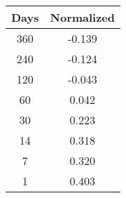 \begin{tabular}{||c c||} 
 \hline
 Days & Normalized \\ [0.5ex] 
 \hline\hline
 360 & -0.139 \\
 \hline
 240 & -0.124 \\
 \hline
 120 & -0.043 \\
 \hline
  60 &  0.042 \\
 \hline
  30 &  0.223 \\
 \hline
  14 &  0.318 \\
 \hline
   7 &  0.320 \\
 \hline
   1 &  0.403 \\ [1ex] 
 \hline
\end{tabular}